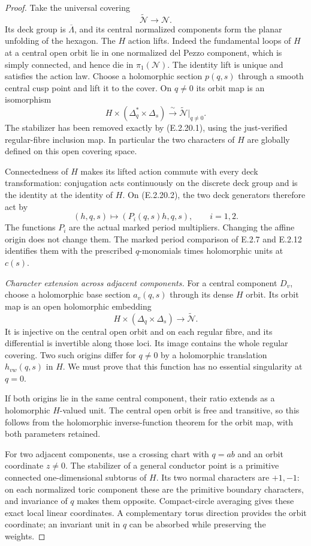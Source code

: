 \begin{proof}
Take the universal covering
\[
 \widetilde{\mathcal N}\longrightarrow\mathcal N.
\]
Its deck group is
$\overline\Lambda$, and its
central normalized components
form the planar unfolding of
the hexagon.  The $H$ action
lifts.  Indeed the fundamental
loops of $H$ at a central open
orbit lie in one normalized
del Pezzo component, which is
simply connected, and hence die
in $\pi_1(\mathcal N)$.
The identity lift is unique
and satisfies the action law.
Choose a holomorphic section
$p(q,s)$ through a smooth
central cusp point and lift
it to the cover.  On $q\ne0$
its orbit map is an isomorphism
\[
 H\times(\Delta_q^*\times\Delta_s)
       \xrightarrow{\ \sim\ }
 \widetilde{\mathcal N}|_{q\ne0}.
 \tag{E.2.20.2}
\]
The stabilizer has been removed
exactly by (E.2.20.1), using
the just-verified regular-fibre
inclusion map.  In particular
the two characters of $H$
are globally defined on this
open covering space.

Connectedness of $H$ makes
its lifted action commute
with every deck transformation:
conjugation acts continuously
on the discrete deck group
and is the identity at the
identity of $H$.  On
(E.2.20.2), the two deck
generators therefore act by
\[
 (h,q,s)\longmapsto(P_i(q,s)h,q,s),
 \qquad i=1,2.
 \tag{E.2.20.3}
\]
The functions $P_i$ are the
actual marked period multipliers.
Changing the affine origin
does not change them.
The marked period comparison
of E.2.7 and E.2.12 identifies
them with the prescribed
$q$-monomials times holomorphic
units at $c(s)$.

\emph{Character extension across adjacent components.}
For a central component $D_v$,
choose a holomorphic base
section $a_v(q,s)$ through
its dense $H$ orbit.  Its
orbit map is an open
holomorphic embedding
\[
 H\times(\Delta_q\times\Delta_s)
       \longrightarrow\widetilde{\mathcal N}.
\]
It is injective on the
central open orbit and on
each regular fibre, and
its differential is invertible
along those loci.  Its
image contains the whole
regular covering.  Two
such origins differ for
$q\ne0$ by a holomorphic
translation $h_{vw}(q,s)$
in $H$.  We must prove
that this function has no
essential singularity at
$q=0$.

If both origins lie in
the same central component,
their ratio extends as a
holomorphic $H$-valued
unit.  The central open
orbit is free and transitive,
so this follows from the
holomorphic inverse-function
theorem for the orbit map,
with both parameters retained.

For two adjacent components,
use a crossing chart with
$q=ab$ and an orbit coordinate
$z\ne0$.  The stabilizer
of a general conductor
point is a primitive
connected one-dimensional
subtorus of $H$.  Its
two normal characters are
$+1,-1$: on each normalized
toric component these are
the primitive boundary
characters, and invariance
of $q$ makes them opposite.
Compact-circle averaging
gives these exact local
linear coordinates.  A
complementary torus direction
provides the orbit coordinate;
an invariant unit in $q$
can be absorbed while
preserving the weights.


\end{proof}

